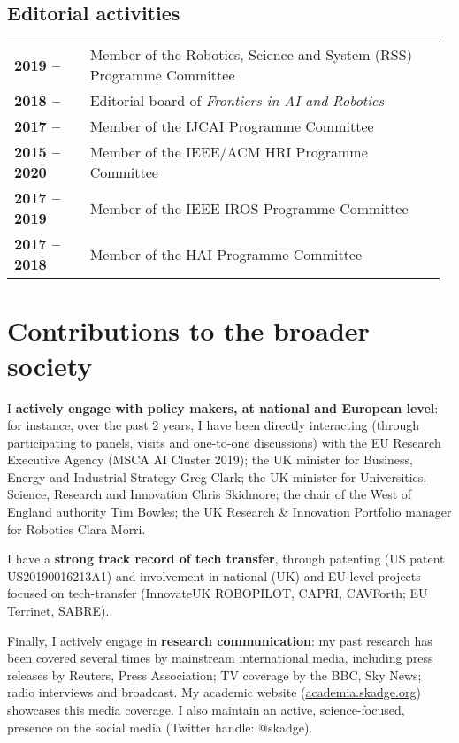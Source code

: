 \subsection{Editorial activities}

\begin{tabular}{p{0.17\linewidth}p{0.8\linewidth}}
    \bf 2019 --  & Member of the Robotics, Science and System (RSS) Programme Committee  \\
    \bf 2018 --  & Editorial board of \emph{Frontiers in AI and Robotics} \\
    \bf 2017 --  & Member of the IJCAI Programme Committee  \\
    \bf 2015 -- 2020 & Member of the IEEE/ACM HRI Programme Committee \\
    \bf 2017 -- 2019 & Member of the IEEE IROS Programme Committee  \\
    \bf 2017 -- 2018 & Member of the HAI Programme Committee  \\
\end{tabular}

\vspace{2em}
\section{Contributions to the broader society}

I \textbf{actively engage with policy makers, at national and European
level}: for instance, over the past 2 years, I have been directly interacting
(through participating to panels, visits and one-to-one discussions) with the EU
Research Executive Agency (MSCA AI Cluster 2019); the UK minister for Business,
Energy and Industrial Strategy Greg Clark; the UK minister for Universities,
Science, Research and Innovation Chris Skidmore; the chair of the West of
England authority Tim Bowles; the UK Research \& Innovation Portfolio
manager for Robotics Clara Morri.

I have a \textbf{strong track record of tech transfer}, through patenting (US patent
US20190016213A1) and involvement in national (UK) and EU-level projects focused on
tech-transfer (InnovateUK ROBOPILOT, CAPRI, CAVForth; EU Terrinet, SABRE).

Finally, I actively engage in \textbf{research communication}: my past research has been
covered several times by mainstream international media, including press
releases by Reuters, Press Association; TV coverage by the BBC, Sky News; radio
interviews and broadcast. My academic website (\url{academia.skadge.org})
showcases this media coverage. I also maintain an active, science-focused,
presence on the social media (Twitter handle: @skadge).

